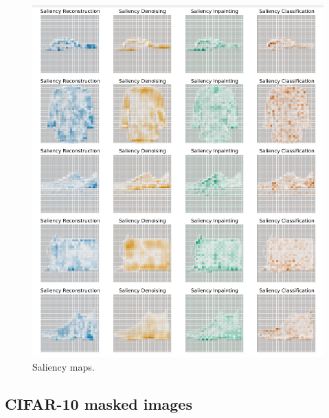 \begin{figure}[H]
    \centering
    \includegraphics[width=13cm]{images/saliency_fmnist.png}
    \caption{Saliency maps.}
    \label{fig:saliency_maps_pretext_fmnist}
\end{figure}

\subsection{CIFAR-10 masked images}


